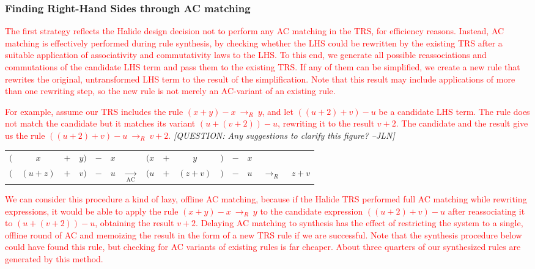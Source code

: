 \documentclass[acmsmall,review]{acmart}\settopmatter{printfolios=true,printccs=false,printacmref=false}
\newcommand{\jln}[1]{\textcolor{uwpurple}{\textit{[{#1} --JLN]}}}
\newcommand{\modified}[1]{\textcolor{red}{{#1}}}
\newcommand{\rewrites}[0]{\:\rightarrow_{R}\:}
\begin{document}
\subsubsection{Finding Right-Hand Sides through AC matching}
\label{sec:rhsacmatching}
\modified{The first strategy reflects the Halide design decision not to perform any AC matching in the TRS, for efficiency reasons. 
Instead, AC matching is effectively performed during rule synthesis, by checking whether the LHS could be 
rewritten by the existing TRS after a suitable application of associativity and commutativity laws to the LHS. 
To this end, we generate all possible reassociations and commutations of the candidate LHS term and pass them to the existing TRS. 
If any of them can be simplified, we create a new rule that rewrites 
the original, untransformed LHS term to the result of the simplification.  Note that this result may include applications of more than one rewriting step, so the new rule is not merely an AC-variant of an existing rule. }

\modified{For example, assume our TRS includes the rule $(x + y) - x \rewrites y$, 
and let $((u + 2) + v) - u$ be a candidate LHS term. The rule does not match the candidate but it matches its variant $(u + (v + 2)) - u$, rewriting it to the result $v + 2$. The candidate and the result give us the rule $((u + 2) + v) - u \rewrites v + 2$. }
\jln{QUESTION: Any suggestions to clarify this figure?}

\begin{center}
\begin{tabular}{ccccccccccccccc}
$($ & $x$       & $+$ & $y)$ & $-$ &  $x$ &                                     & $(x$      & $+$ & $y$       & $)$ & $-$ &  $x$ &             & \\
$($ & $(u + z)$ & $+$ & $v)$ & $-$ &  $u$ & $\xrightarrow[\text{AC}]{\text{}}$  & $(u$      & $+$ & $(z + v)$ & $)$ & $-$ &  $u$ & $\rewrites$ & $z + v$ 
\end{tabular}
\end{center}





\modified{We can consider this procedure a kind of lazy, offline AC matching, because if the Halide TRS 
performed full AC matching while rewriting expressions, it would be able to apply the rule $(x + y) - x \rewrites  y$ to the candidate expression $((u + 2) + v) - u$ after reassociating it to $(u + (v + 2)) - u$, obtaining the result $v + 2$.  Delaying AC matching to synthesis has the effect of restricting the system to a single, offline round of AC and memoizing the result in the form of a new TRS rule if we are successful. 
Note that the synthesis procedure below could have found this rule, but checking for AC
variants of existing rules is far cheaper. About three quarters of our synthesized rules are generated by this method.}
\end{document}

